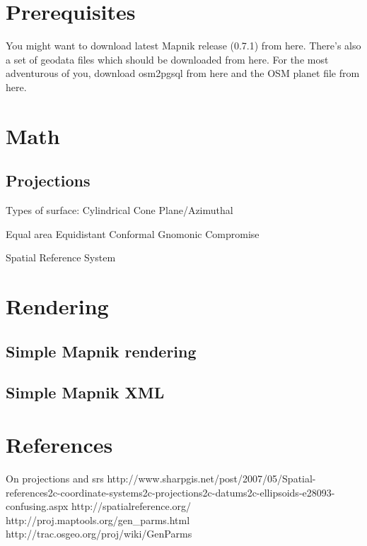 \documentclass{article}
\begin{document}
\section{Prerequisites}

You might want to download latest Mapnik release (0.7.1) from here.
There's also a set of geodata files which should be downloaded from here.
For the most adventurous of you, download osm2pgsql from here and the OSM planet file from here.

\section{Math}

\subsection{Projections}

Types of surface:
Cylindrical
Cone
Plane/Azimuthal

Equal area
Equidistant
Conformal
Gnomonic
Compromise

Spatial Reference System


\section{Rendering}

\subsection{Simple Mapnik rendering}



\subsection{Simple Mapnik XML}

\section{References}

On projections and srs
http://www.sharpgis.net/post/2007/05/Spatial-references2c-coordinate-systems2c-projections2c-datums2c-ellipsoids-e28093-confusing.aspx
http://spatialreference.org/
http://proj.maptools.org/gen_parms.html
http://trac.osgeo.org/proj/wiki/GenParms
\end{document}
